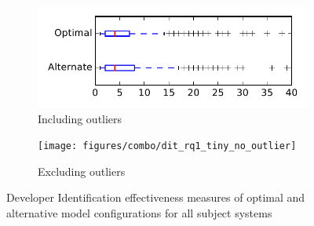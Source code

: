 
\begin{figure}
    \centering
    \begin{subfigure}{.4\textwidth}
        \centering
        \includegraphics[height=0.4\textheight]{figures/combo/dit_rq1_tiny}
        \caption{Including outliers}\label{fig:combo:dit:rq1:tiny_outlier}
    \end{subfigure}%
    \begin{subfigure}{.4\textwidth}
        \centering
        \texttt{[image: figures/combo/dit\_rq1\_tiny\_no\_outlier]}
        \caption{Excluding outliers}\label{fig:combo:dit:rq1:tiny_no_outlier}
    \end{subfigure}
\caption{Developer Identification effectiveness measures of optimal and alternative model configurations for all subject systems}
\label{fig:combo:dit:rq1:tiny}
\end{figure}
